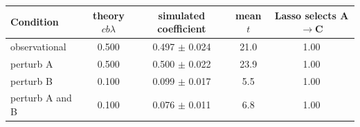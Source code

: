 \begin{tabular}{lcccc}
\toprule
Condition & theory $cb\lambda$ & simulated coefficient & mean $t$ & Lasso selects A$\to$C \\
\midrule
observational & 0.500 & 0.497 $\pm$ 0.024 & 21.0 & 1.00 \\
perturb A & 0.500 & 0.500 $\pm$ 0.022 & 23.9 & 1.00 \\
perturb B & 0.100 & 0.099 $\pm$ 0.017 & 5.5 & 1.00 \\
perturb A and B & 0.100 & 0.076 $\pm$ 0.011 & 6.8 & 1.00 \\
\bottomrule
\end{tabular}